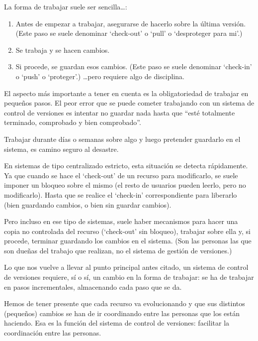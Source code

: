 \documentclass[spanish,12pt,a4paper,final,oneside]{book}
\begin{document}
La forma de trabajar suele ser sencilla\ldots:
\begin{enumerate}
\item Antes de empezar a trabajar, asegurarse de hacerlo sobre la última versión. (Este paso se suele denominar ‘check-out’ o ‘pull’ o ‘desproteger para mi’.)
\item Se trabaja y se hacen cambios. 
\item Si procede, se guardan esos cambios. (Este paso se suele denominar ‘check-in’ o ‘push’ o ‘proteger’.)
\ldots pero requiere algo de disciplina.
\end{enumerate}

El aspecto más importante a tener en cuenta es la obligatoriedad de trabajar en pequeños pasos. El peor error que se puede cometer trabajando con un sistema de control de versiones es intentar no guardar nada hasta que ``esté totalmente terminado, comprobado y bien comprobado''. 

Trabajar durante días o semanas sobre algo y luego pretender guardarlo en el sistema, es camino seguro al desastre.

En sistemas de tipo centralizado estricto, esta situación se detecta rápidamente. Ya que cuando se hace el ‘check-out’ de un recurso para modificarlo, se suele imponer un bloqueo sobre el mismo (el resto de usuarios pueden leerlo, pero no modificarlo). Hasta que se realice el ‘check-in’ correspondiente para liberarlo (bien guardando cambios, o bien sin guardar cambios). 

Pero incluso en ese tipo de sistemas, suele haber mecanismos para hacer una copia no controlada del recurso (‘check-out’ sin bloqueo), trabajar sobre ella y, si procede, terminar guardando los cambios en el sistema. (Son las personas las que son dueñas del trabajo que realizan, no el sistema de gestión de versiones.)

Lo que nos vuelve a llevar al punto principal antes citado, un sistema de control de versiones requiere, sí o sí, un cambio en la forma de trabajar: se ha de trabajar en pasos incrementales, almacenando cada paso que se da. 

Hemos de tener presente que cada recurso va evolucionando y que sus distintos (pequeños) cambios se han de ir coordinando entre las personas que los están haciendo. Esa es la función del sistema de control de versiones: facilitar la coordinación entre las personas.
\end{document}
